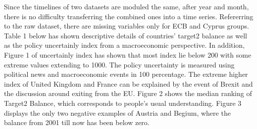 \documentclass[12pt]{article}
\begin{document}
Since the timelines of two datasets are moduled the same, after year and month, there is no difficulty transferring the combined ones into a time series. Refererring to the raw dataset, there are missing variables only for ECB and Cyprus groups. Table 1 below has shown descriptive details of countries' target2 balance as well as the policy uncertainly index from a macroeconomic perspective. In addition, Figure 1 of uncertainly index has shown that most index lie below 200 with some extreme values extending to 1000. The policy uncertainty is measured using political news and macroeconomic events in 100 percentage. The extreme higher index of United Kingdom and France can be explained by the event of Brexit and the discussion around exiting from the EU. Figure 2 shows the median ranking of Target2 Balance, which corresponds to people's usual understanding. Figure 3 displays the only two negative examples of Austria and Begium, where the balance from 2001 till now has been below zero. 
\end{document}
